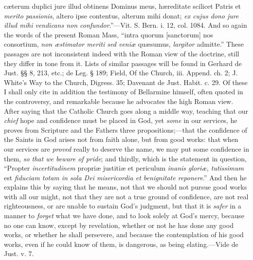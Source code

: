 cæterum duplici jure illud obtinens Dominus meus, hæreditate
scilicet Patris et \emph{merito passionis}, altero ipse contentus,
alterum mihi donat; \emph{ex cujus dono jure illud mihi vendicans non
confundor}.''—Vit. S. Bern. i. 12, col. 1084. And so again
the words of the present Roman Mass, ``intra quorum [sanctorum]
nos consortium, \emph{non æstimator meriti sed veniæ} quæsumus, \emph{largitor}
admitte.'' These passages are not inconsistent indeed with the
Roman view of the doctrine, still they differ in tone from it. Lists
of similar passages will be found in Gerhard de Just. §§ 8, 213,
etc.; de Leg. § 189; Field, Of the Church, iii. Append. ch. 2; J.
White's Way to the Church, Digress. 35; Davenant de Just. Habit. c.
29. Of these I shall only cite in addition the testimony of Bellarmine
himself, often quoted in the controversy, and remarkable because he
advocates the high Roman view. After saying that the Catholic Church
goes along a middle way, teaching that our \emph{chief} hope and
confidence must be placed in God, yet \emph{some} in our services, he
proves from Scripture and the Fathers three propositions;—that the
confidence of the Saints in God arises not from faith alone, but from
good works: that when our services are \emph{proved} really to
deserve the name, we may put some confidence in them, \emph{so that we
beware of pride}; and thirdly, which is the statement in question,
``Propter \emph{incertitudinem} propriæ justitiæ et periculum \emph{inanis
gloriæ, tutissimum} est \emph{fiduciam totam in sola Dei misericordia
et benignitate reponere}.'' And then he explains this by saying
that he means, not that we should not pursue good works with all our
might, not that they are not a true ground of confidence, are not real
righteousness, or are unable to sustain God's judgment, but that it is
\emph{safer} in a manner to \emph{forget} what we have done, and to
look solely at God's mercy, because no one can know, except by
revelation, whether or not he has done any good works, or whether he
shall persevere, and because the contemplation of his good works, even
if he could know of them, is dangerous, as being elating.—Vide de
Just. v. 7.

